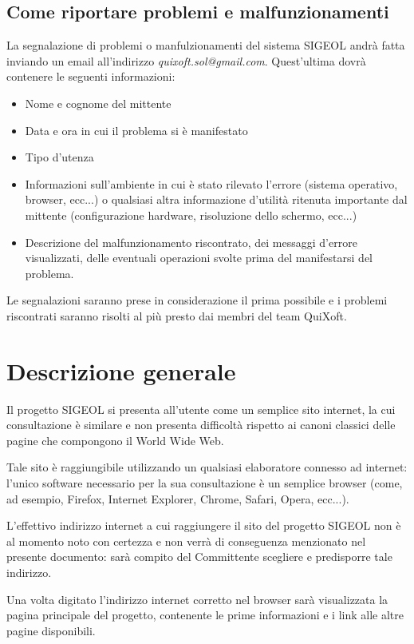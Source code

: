 \documentclass[11pt,a4paper]{article}
\begin{document}
\subsection{Come riportare problemi e malfunzionamenti}
La segnalazione di problemi o manfulzionamenti del sistema SIGEOL andrà fatta inviando un email all'indirizzo \textit{quixoft.sol@gmail.com}.
Quest'ultima dovrà contenere le seguenti informazioni:
\begin{itemize}
 \item Nome e cognome del mittente
 \item Data e ora in cui il problema si è manifestato
 \item Tipo d'utenza
 \item Informazioni sull'ambiente in cui è stato rilevato l'errore (sistema operativo, browser, ecc...) o qualsiasi altra informazione d'utilità ritenuta importante dal mittente (configurazione hardware, risoluzione dello schermo, ecc...)
 \item Descrizione del malfunzionamento riscontrato, dei messaggi d'errore visualizzati, delle eventuali operazioni svolte prima del manifestarsi del problema.
\end{itemize}
Le segnalazioni saranno prese in considerazione il prima possibile e i problemi riscontrati saranno risolti al più presto dai membri del team QuiXoft.
\section{Descrizione generale}
Il progetto SIGEOL si presenta all'utente come un semplice sito internet, la cui consultazione è similare e non presenta difficoltà rispetto ai canoni classici delle pagine che compongono il World Wide Web.

Tale sito è raggiungibile utilizzando un qualsiasi elaboratore connesso ad internet: l'unico software necessario per la sua consultazione è un semplice browser (come, ad esempio, Firefox, Internet Explorer, Chrome, Safari, Opera, ecc...).

L'effettivo indirizzo internet a cui raggiungere il sito del progetto SIGEOL non è al momento noto con certezza e non verrà di conseguenza menzionato nel presente documento: sarà compito del Committente scegliere e predisporre tale indirizzo.

Una volta digitato l'indirizzo internet corretto nel browser sarà visualizzata la pagina principale del progetto, contenente le prime informazioni e i link alle altre pagine disponibili.
\end{document}
